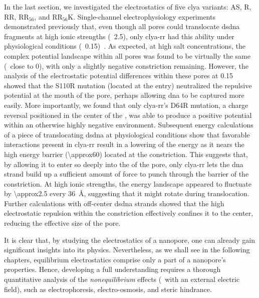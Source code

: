 In the last section, we investigated the electrostatics of five \gls{clya} variants: AS, R, RR, RR$_{56}$, and
RR$_{56}$K. Single-channel electrophysiology experiments demonstrated previously that, even though all pores
could translocate \gls{dsdna} fragments at high ionic strengths (\eg~\SI{2.5}{\Molar}), only \gls{clya-rr} had
this ability under physiological conditions (\eg~\SI{0.15}{\Molar})~\cite{Franceschini-2016}. As expected, at
high salt concentrations, the complex potential landscape within all pores was found to be virtually the same
(\ie~close to 0), with only a slightly negative constriction remaining. However, the analysis of the
electrostatic potential differences within these pores at \SI{0.15}{\Molar} showed that the S110R mutation
(located at the \cisi{} entry) neutralized the repulsive potential at the mouth of the pore, perhaps allowing
\gls{dna} to be captured more easily. More importantly, we found that only \gls{clya-rr}'s D64R mutation, a
charge reversal positioned in the center of the \lumen{}, was able to produce a positive potential within an
otherwise highly negative environment. Subsequent energy calculations of a piece of translocating \gls{dsdna}
at physiological conditions show that favorable interactions present in \gls{clya-rr} result in a lowering of
the energy as it nears the high energy barrier (\SI{\approx60}{\kT}) located at the constriction. This
suggests that, by allowing it to enter so deeply into the \lumen{} of the pore, only \gls{clya-rr} lets the
\gls{dna} strand build up a sufficient amount of force to punch through the barrier of the constriction. At high ionic
strengths, the energy landscape appeared to fluctuate by \SI{\approx2.5}{\kT} every \SI{36}{\angstrom},
suggesting that it might rotate during translocation. Further calculations with off-center \gls{dsdna} strands
showed that the high electrostatic repulsion within the constriction effectively confines it to the center,
reducing the effective size of the pore.

It is clear that, by studying the electrostatics of a nanopore, one can already gain significant insights into
its physics. Nevertheless, as we shall see in the following chapters, equilibrium electrostatics comprise only
a part of a nanopore's properties. Hence, developing a full understanding requires a thorough quantitative
analysis of the \emph{nonequilibrium} effects (\ie~with an external electric field), such as electrophoresis,
electro-osmosis, and steric hindrance.



\cleardoublepage

